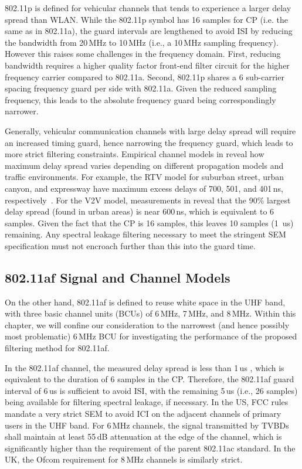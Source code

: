 802.11p is defined for vehicular channels that tends to experience a larger delay spread than WLAN.
While the 802.11p symbol has 16 samples for CP (i.e. the same as in 802.11a), the guard intervals are lengthened to avoid ISI by reducing the bandwidth from 20\,MHz to 10\,MHz (i.e., a 10\,MHz sampling frequency). However this raises some challenges in the frequency domain.
First, reducing bandwidth requires a higher quality factor front-end filter circuit for the higher frequency carrier compared to 802.11a.
Second, 802.11p shares a 6 sub-carrier spacing frequency guard per side with 802.11a. Given the reduced sampling frequency, this leads to the absolute frequency guard being correspondingly narrower.

Generally, vehicular communication channels with large delay spread will require an increased timing guard, hence narrowing the frequency guard, which leads to more strict filtering constraints.
Empirical channel models in \cite{Acosta-Marum2007,Sen2008} reveal how maximum delay spread varies depending on different propagation models and traffic environments.
For example, the RTV model for suburban street, urban canyon, and expressway have maximum excess delays of 700, 501, and 401\,ns, respectively~\cite{Acosta-Marum2007}.
For the V2V model, measurements in \cite{Sen2008} reveal that the 90\% largest delay spread (found in urban areas) is near 600\,ns, which is equivalent to 6 samples.
Given the fact that the CP is 16 samples, this leaves 10 samples (1~us) remaining. Any spectral leakage filtering necessary to meet the stringent SEM specification must not encroach further than this into the guard time.

\subsection{802.11af Signal and Channel Models}

On the other hand, 802.11af is defined to reuse white space in the UHF band, with three basic channel units (BCUs) of 6\,MHz, 7\,MHz, and 8\,MHz.
Within this chapter, we will confine our consideration to the narrowest (and hence possibly most problematic) 6\,MHz BCU for investigating the performance of the proposed filtering method for 802.11af.

In the 802.11af channel, the measured delay spread is less than 1\,us \cite{Lan2013}, which  is equivalent to the duration of 6 samples in the CP.
Therefore, the 802.11af guard interval of 6\,us is sufficient to avoid ISI, with the remaining 5\,us (i.e., 26 samples) being available for filtering spectral leakage, if necessary.
In the US, FCC rules mandate a very strict SEM to avoid ICI on the adjacent channels of primary users in the UHF band.
For 6\,MHz channels, the signal transmitted by TVBDs shall maintain at least 55\,dB attenuation at the edge of the channel, which is significantly higher than the requirement of the parent 802.11ac standard. In the UK, the Ofcom requirement for 8\,MHz channels is similarly strict.

